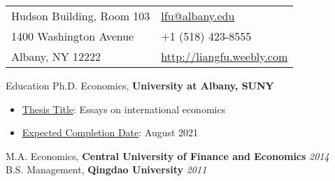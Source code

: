 \documentclass{resume} %
\begin{document}
	
\begin{tabu} to \linewidth {X[l]X[r]}
	Hudson Building, Room 103     &  \href{mailto:lfu@albany.edu}{lfu@albany.edu}  \\
	1400 Washington Avenue        & +1 (518) 423-8555\\
	Albany, NY 12222              &  \href{http://liangfu.weebly.com}{http://liangfu.weebly.com}
\end{tabu}
\bigskip \bigskip










\begin{rSection}{Education}
Ph.D. Economics, {\bf University at Albany, SUNY}                     
  \begin{itemize}
  	\item[] \underline{Thesis Title}: Essays on international economics 
  	\item[] \underline{Expected Completion Date}: August 2021
  \end{itemize}
M.A. Economics, {\bf Central University of Finance and Economics}    \hfill {\em 2014} \\
B.S. Management, {\bf Qingdao University}                            \hfill {\em 2011} \\
\end{rSection}
\bigskip \bigskip
\end{document}

